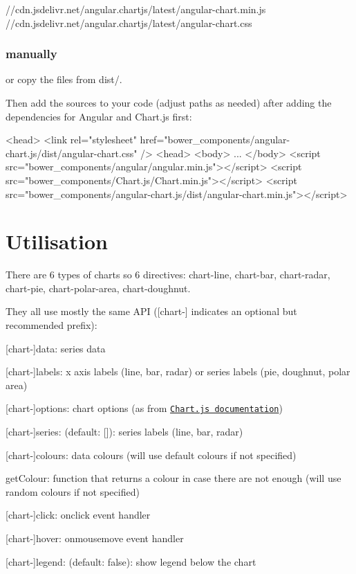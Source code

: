 \begin{DoxyVerb}//cdn.jsdelivr.net/angular.chartjs/latest/angular-chart.min.js
//cdn.jsdelivr.net/angular.chartjs/latest/angular-chart.css
\end{DoxyVerb}


\subsubsection*{manually}

or copy the files from {\ttfamily dist/}.

Then add the sources to your code (adjust paths as needed) after adding the dependencies for Angular and Chart.\+js first\+:


\begin{DoxyCode}
<head>
  <link rel="stylesheet" href="bower\_components/angular-chart.js/dist/angular-chart.css" />
<head>
<body>
  ...
</body>
  <script src="bower\_components/angular/angular.min.js"></script>
  <script src="bower\_components/Chart.js/Chart.min.js"></script>
  <script src="bower\_components/angular-chart.js/dist/angular-chart.min.js"></script>
\end{DoxyCode}


\section*{Utilisation}

There are 6 types of charts so 6 directives\+: {\ttfamily chart-\/line}, {\ttfamily chart-\/bar}, {\ttfamily chart-\/radar}, {\ttfamily chart-\/pie}, {\ttfamily chart-\/polar-\/area}, {\ttfamily chart-\/doughnut}.

They all use mostly the same A\+PI ({\ttfamily \mbox{[}chart-\/\mbox{]}} indicates an optional but recommended prefix)\+:


\begin{DoxyItemize}
\item {\ttfamily \mbox{[}chart-\/\mbox{]}data}\+: series data
\item {\ttfamily \mbox{[}chart-\/\mbox{]}labels}\+: x axis labels (line, bar, radar) or series labels (pie, doughnut, polar area)
\item {\ttfamily \mbox{[}chart-\/\mbox{]}options}\+: chart options (as from \href{http://www.chartjs.org/docs/}{\tt Chart.\+js documentation})
\item {\ttfamily \mbox{[}chart-\/\mbox{]}series}\+: (default\+: {\ttfamily \mbox{[}\mbox{]}})\+: series labels (line, bar, radar)
\item {\ttfamily \mbox{[}chart-\/\mbox{]}colours}\+: data colours (will use default colours if not specified)
\item {\ttfamily get\+Colour}\+: function that returns a colour in case there are not enough (will use random colours if not specified)
\item {\ttfamily \mbox{[}chart-\/\mbox{]}click}\+: onclick event handler
\item {\ttfamily \mbox{[}chart-\/\mbox{]}hover}\+: onmousemove event handler
\item {\ttfamily \mbox{[}chart-\/\mbox{]}legend}\+: (default\+: {\ttfamily false})\+: show legend below the chart
\end{DoxyItemize}

